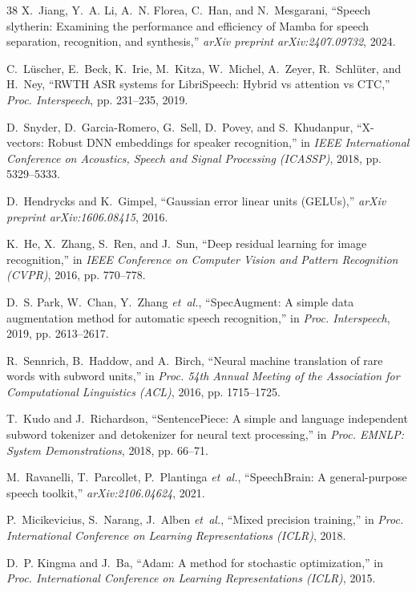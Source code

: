 \documentclass[journal]{IEEEtran}
\begin{document}
\begin{thebibliography}{38}
X.~Jiang, Y.~A. Li, A.~N. Florea, C.~Han, and N.~Mesgarani, ``Speech slytherin:
  Examining the performance and efficiency of {Mamba} for speech separation,
  recognition, and synthesis,'' \emph{arXiv preprint arXiv:2407.09732}, 2024.

C.~L{\"u}scher, E.~Beck, K.~Irie, M.~Kitza, W.~Michel, A.~Zeyer,
  R.~Schl{\"u}ter, and H.~Ney, ``{RWTH} {ASR} systems for {LibriSpeech}: Hybrid
  vs attention vs {CTC},'' \emph{Proc. Interspeech}, pp. 231--235, 2019.

D.~Snyder, D.~Garcia-Romero, G.~Sell, D.~Povey, and S.~Khudanpur, ``X-vectors:
  Robust {DNN} embeddings for speaker recognition,'' in \emph{IEEE
  International Conference on Acoustics, Speech and Signal Processing
  (ICASSP)}, 2018, pp. 5329--5333.

D.~Hendrycks and K.~Gimpel, ``Gaussian error linear units ({GELUs}),''
  \emph{arXiv preprint arXiv:1606.08415}, 2016.

K.~He, X.~Zhang, S.~Ren, and J.~Sun, ``Deep residual learning for image
  recognition,'' in \emph{IEEE Conference on Computer Vision and Pattern
  Recognition (CVPR)}, 2016, pp. 770--778.

D.~S. Park, W.~Chan, Y.~Zhang \emph{et~al.}, ``{SpecAugment}: A simple data
  augmentation method for automatic speech recognition,'' in \emph{Proc.
  Interspeech}, 2019, pp. 2613--2617.

R.~Sennrich, B.~Haddow, and A.~Birch, ``Neural machine translation of rare
  words with subword units,'' in \emph{Proc. 54th Annual Meeting of the
  Association for Computational Linguistics (ACL)}, 2016, pp. 1715--1725.

T.~Kudo and J.~Richardson, ``{SentencePiece}: A simple and language independent
  subword tokenizer and detokenizer for neural text processing,'' in
  \emph{Proc. EMNLP: System Demonstrations}, 2018, pp. 66--71.

M.~Ravanelli, T.~Parcollet, P.~Plantinga \emph{et~al.}, ``{SpeechBrain}: A
  general-purpose speech toolkit,'' \emph{arXiv:2106.04624}, 2021.

P.~Micikevicius, S.~Narang, J.~Alben \emph{et~al.}, ``Mixed precision
  training,'' in \emph{Proc. International Conference on Learning
  Representations (ICLR)}, 2018.



D.~P. Kingma and J.~Ba, ``Adam: A method for stochastic optimization,'' in
  \emph{Proc. International Conference on Learning Representations (ICLR)},
  2015.

\end{thebibliography}
\endgroup
\end{document}

